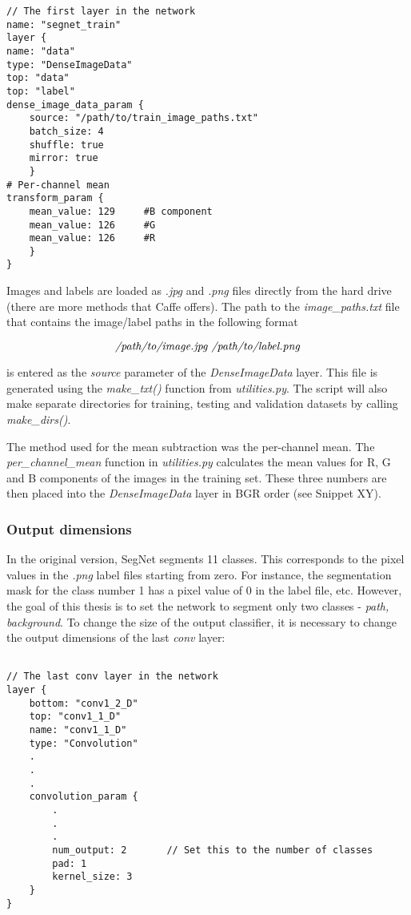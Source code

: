 \begin{lstlisting}[caption={Input layer in \textit{train.prototxt} \cite{filip_github}},captionpos=b]
// The first layer in the network
name: "segnet_train"
layer {
name: "data"
type: "DenseImageData"
top: "data"
top: "label"
dense_image_data_param {
	source: "/path/to/train_image_paths.txt"
	batch_size: 4   			    			
	shuffle: true
	mirror: true	
	}
# Per-channel mean
transform_param {
	mean_value: 129		#B component
	mean_value: 126		#G
	mean_value: 126		#R
	}
}
\end{lstlisting} 

Images and labels are loaded as \textit{.jpg} and \textit{.png} files directly from the hard drive (there are more methods that Caffe offers). The path to the \textit{image\_paths.txt} file that contains the image/label paths in the following format

$$
\text{\textit{/path/to/image.jpg /path/to/label.png}}
$$

\noindent is entered as the \textit{source} parameter of the \textit{DenseImageData} layer. This file is generated using the \textit{make\_txt()} function from \textit{utilities.py}. The script will also make separate directories for training, testing and validation datasets by calling \textit{make\_dirs()}.

The method used for the mean subtraction was the per-channel mean. The \textit{per\_channel\_mean} function in \textit{utilities.py} calculates the mean values for R, G and B components of the images in the training set. These three numbers are then placed into the \textit{DenseImageData} layer in BGR order (see Snippet XY).

\subsubsection{Output dimensions}

In the original version, SegNet segments 11 classes. This corresponds to the pixel values in the \textit{.png} label files starting from zero. For instance, the segmentation mask for the class number 1 has a pixel value of 0 in the label file, etc. However, the goal of this thesis is to set the network to segment only two classes - \textit{path, background}. To change the size of the output classifier, it is necessary to change the output dimensions of the last \textit{conv} layer:

\begin{lstlisting}[caption={Setting number of outputs in \textit{train.prototxt} \cite{filip_github}},captionpos=b]

// The last conv layer in the network
layer {
	bottom: "conv1_2_D"
	top: "conv1_1_D"
	name: "conv1_1_D"
	type: "Convolution"
	.
	.
	.
	convolution_param {
		.
		.
		.
		num_output: 2		// Set this to the number of classes
		pad: 1
		kernel_size: 3
	}
}
\end{lstlisting}

